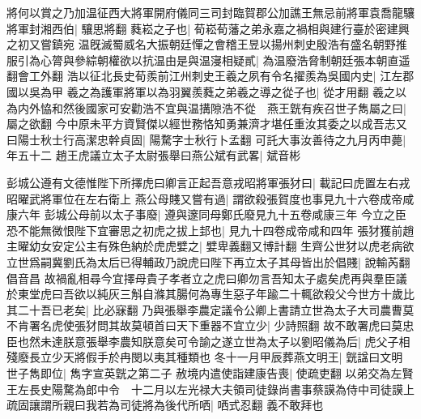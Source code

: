 將何以賞之乃加温征西大將軍開府儀同三司封臨賀郡公加譙王無忌前將軍袁喬龍驤將軍封湘西伯|{
	驤思將翻}
蕤崧之子也|{
	荀崧荀藩之弟永嘉之禍相與建行臺於密建興之初又嘗鎮宛}
温旣滅蜀威名大振朝廷憚之會稽王昱以揚州刺史殷浩有盛名朝野推服引為心膂與參綜朝權欲以抗温由是與温寖相疑貳|{
	為温廢浩脅制朝廷張本朝直遥翻會工外翻}
浩以征北長史荀羨前江州刺史王羲之夙有令名擢羨為吳國内史|{
	江左郡國以吳為甲}
羲之為護軍將軍以為羽翼羨蕤之弟羲之導之從子也|{
	從才用翻}
羲之以為内外恊和然後國家可安勸浩不宜與温搆隙浩不從　燕王皝有疾召世子雋屬之曰|{
	屬之欲翻}
今中原未平方資賢傑以經世務恪知勇兼濟才堪任重汝其委之以成吾志又曰陽士秋士行高潔忠幹貞固|{
	陽騖字士秋行卜孟翻}
可託大事汝善待之九月丙申薨|{
	年五十二}
趙王虎議立太子太尉張舉曰燕公斌有武畧|{
	斌音彬}


彭城公遵有文德惟陛下所擇虎曰卿言正起吾意戎昭將軍張犲曰|{
	載記曰虎置左右戎昭曜武將軍位在左右衛上}
燕公母賤又嘗有過|{
	謂欲殺張賀度也事見九十六卷成帝咸康六年}
彭城公母前以太子事廢|{
	遵與邃同母鄭氏廢見九十五卷咸康三年}
今立之臣恐不能無微恨陛下宜審思之初虎之拔上邽也|{
	見九十四卷成帝咸和四年}
張犲獲前趙主曜幼女安定公主有殊色納於虎虎嬖之|{
	嬖卑義翻又博計翻}
生齊公世犲以虎老病欲立世爲嗣冀劉氏為太后已得輔政乃說虎曰陛下再立太子其母皆出於倡賤|{
	說輸芮翻倡音昌}
故禍亂相尋今宜擇母貴子孝者立之虎曰卿勿言吾知太子處矣虎再與羣臣議於東堂虎曰吾欲以純灰三斛自滌其腸何為專生惡子年踰二十輒欲殺父今世方十歲比其二十吾已老矣|{
	比必寐翻}
乃與張舉李農定議令公卿上書請立世為太子大司農曹莫不肯署名虎使張犲問其故莫頓首曰天下重器不宜立少|{
	少詩照翻}
故不敢署虎曰莫忠臣也然未達朕意張舉李農知朕意矣可令諭之遂立世為太子以劉昭儀為后|{
	虎父子相殘廢長立少天將假手於冉閔以夷其種類也}
冬十一月甲辰葬燕文明王|{
	皝諡曰文明}
世子雋即位|{
	雋字宣英皝之第二子}
赦境内遣使詣建康告喪|{
	使疏吏翻}
以弟交為左賢王左長史陽騖為郎中令　十二月以左光禄大夫領司徒錄尚書事蔡謨為侍中司徒謨上疏固讓謂所親曰我若為司徒將為後代所哂|{
	哂式忍翻}
義不敢拜也

